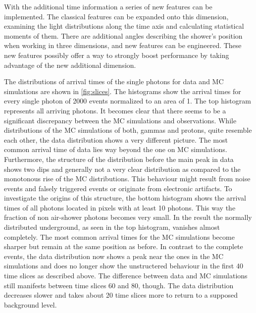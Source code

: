 With the additional time information a series of new features can be
implemented. The classical features can be expanded onto this dimension,
examining the light distributions along the time axis and calculating
statistical moments of them. There are additional angles describing the
shower's position when working in three dimensions, and new features can be
engineered. These new features possibly offer a way to strongly boost
performance by taking advantage of the new additional dimension.

The distributions of arrival times of the single photons for data and MC
simulations are shown in \autoref{fig:slices}. The histograms show the arrival
times for every single photon of 2000 events normalized to an area of 1. The
top histogram represents all arriving photons. It becomes clear that there
seems to be a significant discrepancy between the MC simulations and observations.
While distributions of the MC simulations of both, gammas and protons, quite
resemble each other, the data distribution shows a very different picture. The
most common arrival time of data lies way beyond the one on MC simulations.
Furthermore, the structure of the distribution before the main peak in data
shows two dips and generally not a very clear distribution as compared to the
monotonous rise of the MC distributions. This behaviour might result from noise
events and falsely triggered events or originate from electronic artifacts. To
investigate the origins of this structure, the bottom histogram shows the
arrival times of all photons located in pixels with at least \num{10} photons.
This way the fraction of non air-shower photons becomes very small. In the
result the normally distributed underground, as seen in the top histogram,
vanishes almost completely. The most common arrival times for the MC
simulations become sharper but remain at the same position as before. In
contrast to the complete events, the data distribution now shows a peak near
the ones in the MC simulations and does no longer show the unstructered
behaviour in the first \num{40} time slices as described above. The difference
between data and MC simulations still manifests between time slices \num{60}
and \num{80}, though. The data distribution decreases slower and takes about
\num{20} time slices more to return to a supposed background level.
%
